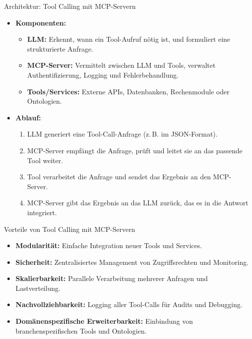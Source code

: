 \documentclass[aspectratio=1610, xcolor=dvipsnames, 9pt]{beamer}
\begin{document}
\begin{frame}{Architektur: Tool Calling mit MCP-Servern}
  \begin{itemize}
    \item \textbf{Komponenten:}
      \begin{itemize}
        \item \textbf{LLM:} Erkennt, wann ein Tool-Aufruf nötig ist, und formuliert eine strukturierte Anfrage.
        \item \textbf{MCP-Server:} Vermittelt zwischen LLM und Tools, verwaltet Authentifizierung, Logging und Fehlerbehandlung.
        \item \textbf{Tools/Services:} Externe APIs, Datenbanken, Rechenmodule oder Ontologien.
      \end{itemize}
    \item \textbf{Ablauf:}
      \begin{enumerate}
        \item LLM generiert eine Tool-Call-Anfrage (z. B. im JSON-Format).
        \item MCP-Server empfängt die Anfrage, prüft und leitet sie an das passende Tool weiter.
        \item Tool verarbeitet die Anfrage und sendet das Ergebnis an den MCP-Server.
        \item MCP-Server gibt das Ergebnis an das LLM zurück, das es in die Antwort integriert.
      \end{enumerate}
  \end{itemize}
\end{frame}

\begin{frame}{Vorteile von Tool Calling mit MCP-Servern}
  \begin{itemize}
    \item \textbf{Modularität:} Einfache Integration neuer Tools und Services.
    \item \textbf{Sicherheit:} Zentralisiertes Management von Zugriffsrechten und Monitoring.
    \item \textbf{Skalierbarkeit:} Parallele Verarbeitung mehrerer Anfragen und Lastverteilung.
    \item \textbf{Nachvollziehbarkeit:} Logging aller Tool-Calls für Audits und Debugging.
    \item \textbf{Domänenspezifische Erweiterbarkeit:} Einbindung von branchenspezifischen Tools und Ontologien.
  \end{itemize}
\end{frame}
\end{document}
